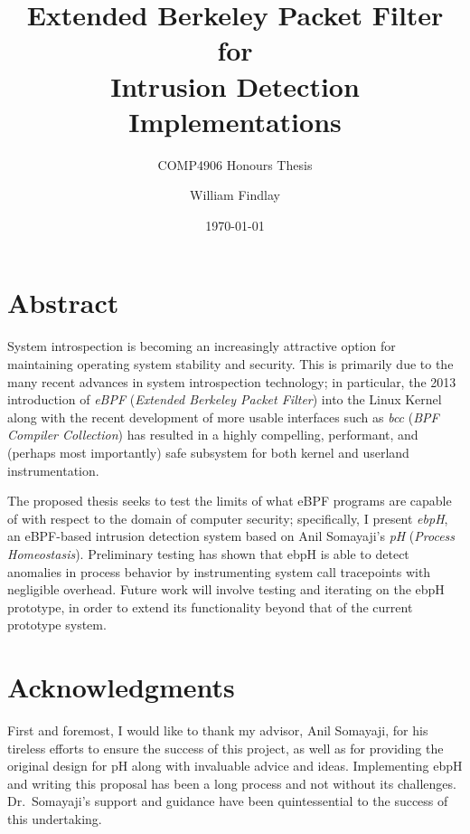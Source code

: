 \documentclass[
  12pt]{findlay}
\title{Extended Berkeley Packet Filter for\\
Intrusion Detection Implementations}
\subtitle{COMP4906 Honours Thesis}
\author{William Findlay}
\date{\today}
\begin{document}
\maketitle

\pagestyle{fancy}

\thispagestyle{empty}

\onehalfspacing

\clearpage
{}
\section*{Abstract}

System introspection is becoming an increasingly attractive option for
maintaining operating system stability and security. This is primarily
due to the many recent advances in system introspection technology; in
particular, the 2013 introduction of \emph{eBPF} (\emph{Extended
Berkeley Packet Filter}) into the Linux Kernel \autocite{starovoitov13}
along with the recent development of more usable interfaces such as
\emph{bcc} (\emph{BPF Compiler Collection}) \autocite{bcc} has resulted
in a highly compelling, performant, and (perhaps most importantly) safe
subsystem for both kernel and userland instrumentation.

The proposed thesis seeks to test the limits of what eBPF programs are
capable of with respect to the domain of computer security;
specifically, I present \emph{ebpH}, an eBPF-based intrusion detection
system based on Anil Somayaji's \autocite{soma02} \emph{pH}
(\emph{Process Homeostasis}). Preliminary testing has shown that ebpH is
able to detect anomalies in process behavior by instrumenting system
call tracepoints with negligible overhead. Future work will involve
testing and iterating on the ebpH prototype, in order to extend its
functionality beyond that of the current prototype system.

\newpage
\section*{Acknowledgments}

First and foremost, I would like to thank my advisor, Anil Somayaji, for
his tireless efforts to ensure the success of this project, as well as
for providing the original design for pH along with invaluable advice
and ideas. Implementing ebpH and writing this proposal has been a long
process and not without its challenges. Dr.~Somayaji's support and
guidance have been quintessential to the success of this undertaking.
\end{document}
